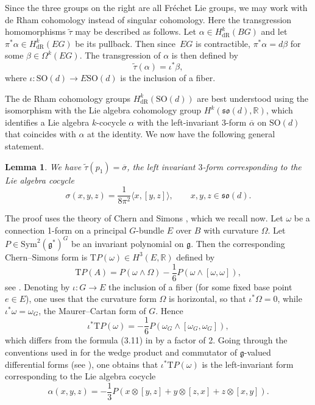 \documentclass[pdftex]{sigma}
\numberwithin{equation}{section}
\newtheorem{Lemma}[Theorem]{Lemma}
\newcommand{\R}{\mathbb{R}}
\newcommand{\SO}{\mathrm{SO}}
\begin{document}
Since the three groups on the right are all Fr\'echet Lie groups, we may work with de Rham cohomology instead of singular cohomology.
Here the transgression homomorphisms $\tilde{\tau}$ may be described as follows.
Let $\alpha \in H^k_{\mathrm{dR}}(BG)$ and let $\pi^*\alpha \in H^k_{\mathrm{dR}}(EG)$ be its pullback.
Then since~$EG$ is contractible, $\pi^* \alpha = d \beta$ for some $\beta \in \Omega^k(EG)$.
The transgression of $\alpha$ is then defined by
\begin{equation}
\label{DefTransgressionTilde}
	\tilde{\tau}(\alpha) = \iota^*\beta,
\end{equation}
where $\iota \colon \SO(d) \to E\SO(d)$ is the inclusion of a fiber.

The de Rham cohomology groups $H^k_{\mathrm{dR}}(\SO(d))$ are best understood using the isomorphism with the Lie algebra cohomology group $H^k(\mathfrak{so}(d), \R)$, which identifies a Lie algebra $k$-cocycle $\alpha$ with the left-invariant 3-form $\overline{\alpha}$ on $\SO(d)$ that coincides with $\alpha$ at the identity.
We now have the following general statement.

\begin{Lemma}
\label{SecondLemmaA}
We have $\tilde{\tau}(p_1) = \overline{\sigma}$, the left invariant $3$-form corresponding to the Lie algebra cocycle
\begin{equation*}
 \sigma(x, y, z) = \frac{1}{8 \pi^2} \langle x, [y, z] \rangle, \qquad x, y, z \in \mathfrak{so}(d).	
\end{equation*}
\end{Lemma}

The proof uses the theory of Chern and Simons \cite{ChernSimons}, which we recall now.
Let $\omega$ be a connection 1-form on a principal $G$-bundle $E$ over $B$ with curvature $\Omega$.
Let $P \in \mathrm{Sym}^2(\mathfrak{g}^*)^G$ be an invariant polynomial on $\mathfrak{g}$.
Then the corresponding Chern--Simons form is $\mathrm{T}P(\omega) \in H^3(E, \R)$ defined by
\begin{equation*}
 \mathrm{T}P(A) = P(\omega \wedge \Omega) - \frac{1}{6} P(\omega \wedge [\omega, \omega]),
\end{equation*}
see \cite[formula~(3.5)]{ChernSimons}.
Denoting by $\iota \colon G \to E$ the inclusion of a fiber (for some fixed base point~$e \in E$), one uses that the curvature form $\Omega$ is horizontal, so that $\iota^*\Omega = 0$, while $\iota^*\omega = \omega_G$, the Maurer--Cartan form of $G$.
Hence
\begin{equation*}
\iota^*\mathrm{T}P(\omega) = -\frac{1}{6} P(\omega_G \wedge [\omega_G, \omega_G]),
\end{equation*}
which differs from the formula (3.11) in \cite{ChernSimons} by a factor of 2.
Going through the conventions used in \cite{ChernSimons} for the wedge product and commutator of $\mathfrak{g}$-valued differential forms (see \cite[p.~50]{ChernSimons}), one obtains that $\iota^* \mathrm{T}P(\omega)$ is the left-invariant form corresponding to the Lie algebra cocycle
\begin{equation}
\label{DefinitionAlpha}
 \alpha(x, y, z) =	- \frac{1}{3} P(x \otimes [y, z] + y \otimes [z, x] + z \otimes [x, y]).
\end{equation}
\end{document}
